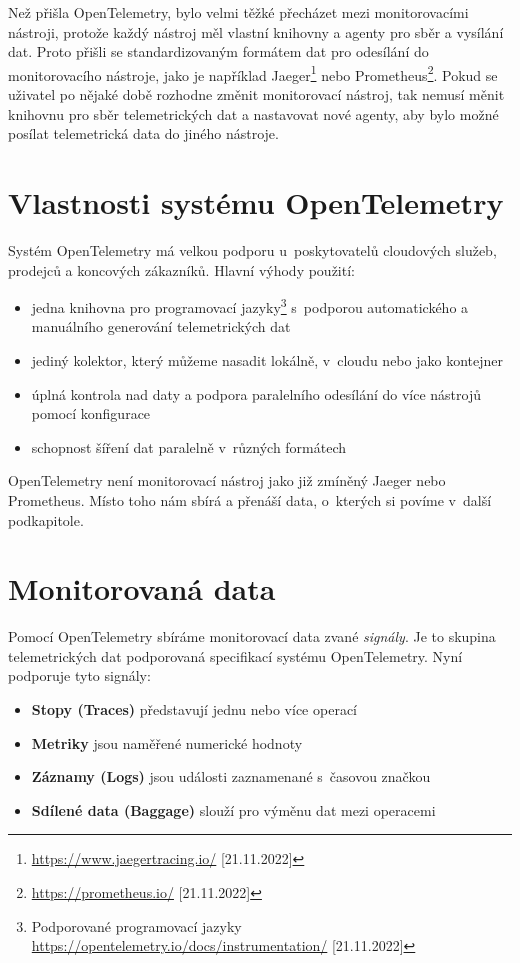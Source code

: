 Než přišla OpenTelemetry, bylo velmi těžké přecházet mezi monitorovacími nástroji, protože každý nástroj měl vlastní knihovny a agenty pro sběr a vysílání dat. Proto přišli se standardizovaným formátem dat pro odesílání do monitorovacího nástroje, jako je například Jaeger\footnote{\url{https://www.jaegertracing.io/} [21.11.2022]} nebo Prometheus\footnote{\url{https://prometheus.io/} [21.11.2022]}. Pokud se uživatel po nějaké době rozhodne změnit monitorovací nástroj, tak nemusí měnit knihovnu pro sběr telemetrických dat a nastavovat nové agenty, aby bylo možné posílat telemetrická data do jiného nástroje.

\section{Vlastnosti systému OpenTelemetry}
Systém OpenTelemetry má velkou podporu u~poskytovatelů cloudových služeb, prodejců a koncových zákazníků. Hlavní výhody použití:
\begin{itemize}
  \item{jedna knihovna pro programovací jazyky\footnote{Podporované programovací jazyky \url{https://opentelemetry.io/docs/instrumentation/} [21.11.2022]} s~podporou automatického a manuálního generování telemetrických dat}
  \item{jediný kolektor, který můžeme nasadit lokálně, v~cloudu nebo jako kontejner}
  \item{úplná kontrola nad daty a podpora paralelního odesílání do více nástrojů pomocí konfigurace}
  \item{schopnost šíření dat paralelně v~různých formátech}
\end{itemize}


OpenTelemetry není monitorovací nástroj jako již zmíněný Jaeger nebo Prometheus. Místo toho nám sbírá a přenáší data, o~kterých si povíme v~další podkapitole.

\section{Monitorovaná data}

Pomocí OpenTelemetry sbíráme monitorovací data zvané \textit{signály}. Je to skupina telemetrických dat podporovaná specifikací systému OpenTelemetry. Nyní podporuje tyto signály:
\begin{itemize}
  \item{\textbf{Stopy (Traces)} představují jednu nebo více operací}
  \item{\textbf{Metriky} jsou naměřené numerické hodnoty}
  \item{\textbf{Záznamy (Logs)} jsou události zaznamenané s~časovou značkou}
  \item{\textbf{Sdílené data (Baggage)} slouží pro výměnu dat mezi operacemi}
\end{itemize}

